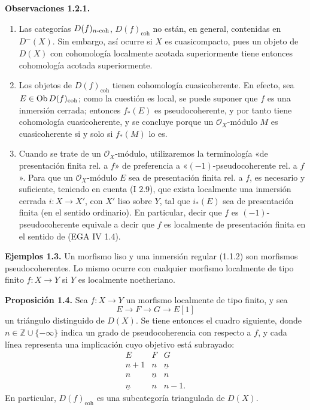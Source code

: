 \textbf{Observaciones 1.2.1.}
\begin{enumerate}[label=\alph*)]
\item Las categorías \(D(f)_{n\text{-}\mathrm{coh}}\), \(D(f)_{\mathrm{coh}}\) no están, en general, contenidas en \(D^{-}(X)\). Sin embargo, así ocurre si \(X\) es cuasicompacto, pues un objeto de \(D(X)\) con cohomología localmente acotada superiormente tiene entonces cohomología acotada superiormente.

\item Los objetos de \(D(f)_{\mathrm{coh}}\) tienen cohomología cuasicoherente. En efecto, sea \(E\in\operatorname{Ob} D(f)_{\mathrm{coh}}\); como la cuestión es local, se puede suponer que \(f\) es una inmersión cerrada; entonces \(f_*(E)\) es pseudocoherente, y por tanto tiene cohomología cuasicoherente, y se concluye porque un \(\mathcal O_X\)-módulo \(M\) es cuasicoherente si y solo si \(f_*(M)\) lo es.

\item Cuando se trate de un \(\mathcal O_X\)-módulo, utilizaremos la terminología «de presentación finita rel. a \(f\)» de preferencia a «\((-1)\)-pseudocoherente rel. a \(f\)». Para que un \(\mathcal O_X\)-módulo \(E\) sea de presentación finita rel. a \(f\), es necesario y suficiente, teniendo en cuenta (I 2.9), que exista localmente una inmersión cerrada \(i:X\to X'\), con \(X'\) liso sobre \(Y\), tal que \(i_*(E)\) sea de presentación finita (en el sentido ordinario). En particular, decir que \(f\) es \((-1)\)-pseudocoherente equivale a decir que \(f\) es localmente de presentación finita en el sentido de (EGA IV 1.4).
\end{enumerate}

\textbf{Ejemplos 1.3.} Un morfismo liso y una inmersión regular (1.1.2) son morfismos pseudocoherentes. Lo mismo ocurre con cualquier morfismo localmente de tipo finito \(f:X\to Y\) si \(Y\) es localmente noetheriano.

\textbf{Proposición 1.4.} Sea \(f:X\to Y\) un morfismo localmente de tipo finito, y sea
\[
E\longrightarrow F\longrightarrow G\longrightarrow E[1]
\]
un triángulo distinguido de \(D(X)\). Se tiene entonces el cuadro siguiente, donde \(n\in\mathbb Z\cup\{-\infty\}\) indica un grado de pseudocoherencia con respecto a \(f\), y cada línea representa una implicación cuyo objetivo está subrayado:
\[
\begin{array}{ccc}
E&F&G\\
n+1&n&\underline n\\
n&\underline n&n\\
\underline n&n&n-1.
\end{array}
\]
En particular, \(D(f)_{\mathrm{coh}}\) es una subcategoría triangulada de \(D(X)\).

